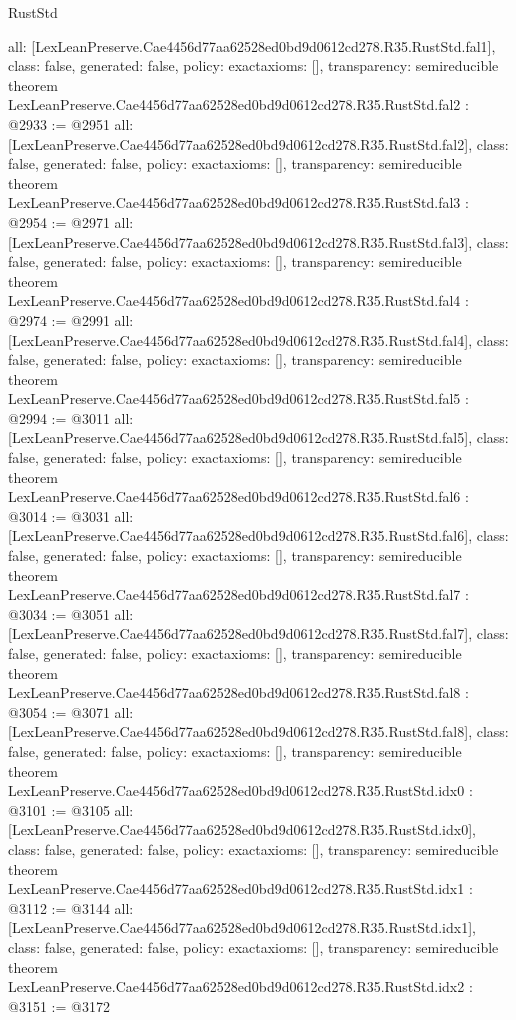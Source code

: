 \begin{lexlean}{RustStd}
\begin{coremodule}
{  all: [LexLeanPreserve.Cae4456d77aa62528ed0bd9d0612cd278.R35.RustStd.fal1],
  class: false,
  generated: false,
  policy: exact{axioms: []},
  transparency: semireducible
}
theorem LexLeanPreserve.Cae4456d77aa62528ed0bd9d0612cd278.R35.RustStd.fal2 : @2933 := @2951 {
  all: [LexLeanPreserve.Cae4456d77aa62528ed0bd9d0612cd278.R35.RustStd.fal2],
  class: false,
  generated: false,
  policy: exact{axioms: []},
  transparency: semireducible
}
theorem LexLeanPreserve.Cae4456d77aa62528ed0bd9d0612cd278.R35.RustStd.fal3 : @2954 := @2971 {
  all: [LexLeanPreserve.Cae4456d77aa62528ed0bd9d0612cd278.R35.RustStd.fal3],
  class: false,
  generated: false,
  policy: exact{axioms: []},
  transparency: semireducible
}
theorem LexLeanPreserve.Cae4456d77aa62528ed0bd9d0612cd278.R35.RustStd.fal4 : @2974 := @2991 {
  all: [LexLeanPreserve.Cae4456d77aa62528ed0bd9d0612cd278.R35.RustStd.fal4],
  class: false,
  generated: false,
  policy: exact{axioms: []},
  transparency: semireducible
}
theorem LexLeanPreserve.Cae4456d77aa62528ed0bd9d0612cd278.R35.RustStd.fal5 : @2994 := @3011 {
  all: [LexLeanPreserve.Cae4456d77aa62528ed0bd9d0612cd278.R35.RustStd.fal5],
  class: false,
  generated: false,
  policy: exact{axioms: []},
  transparency: semireducible
}
theorem LexLeanPreserve.Cae4456d77aa62528ed0bd9d0612cd278.R35.RustStd.fal6 : @3014 := @3031 {
  all: [LexLeanPreserve.Cae4456d77aa62528ed0bd9d0612cd278.R35.RustStd.fal6],
  class: false,
  generated: false,
  policy: exact{axioms: []},
  transparency: semireducible
}
theorem LexLeanPreserve.Cae4456d77aa62528ed0bd9d0612cd278.R35.RustStd.fal7 : @3034 := @3051 {
  all: [LexLeanPreserve.Cae4456d77aa62528ed0bd9d0612cd278.R35.RustStd.fal7],
  class: false,
  generated: false,
  policy: exact{axioms: []},
  transparency: semireducible
}
theorem LexLeanPreserve.Cae4456d77aa62528ed0bd9d0612cd278.R35.RustStd.fal8 : @3054 := @3071 {
  all: [LexLeanPreserve.Cae4456d77aa62528ed0bd9d0612cd278.R35.RustStd.fal8],
  class: false,
  generated: false,
  policy: exact{axioms: []},
  transparency: semireducible
}
theorem LexLeanPreserve.Cae4456d77aa62528ed0bd9d0612cd278.R35.RustStd.idx0 : @3101 := @3105 {
  all: [LexLeanPreserve.Cae4456d77aa62528ed0bd9d0612cd278.R35.RustStd.idx0],
  class: false,
  generated: false,
  policy: exact{axioms: []},
  transparency: semireducible
}
theorem LexLeanPreserve.Cae4456d77aa62528ed0bd9d0612cd278.R35.RustStd.idx1 : @3112 := @3144 {
  all: [LexLeanPreserve.Cae4456d77aa62528ed0bd9d0612cd278.R35.RustStd.idx1],
  class: false,
  generated: false,
  policy: exact{axioms: []},
  transparency: semireducible
}
theorem LexLeanPreserve.Cae4456d77aa62528ed0bd9d0612cd278.R35.RustStd.idx2 : @3151 := @3172 {
}
\end{coremodule}
\end{lexlean}
